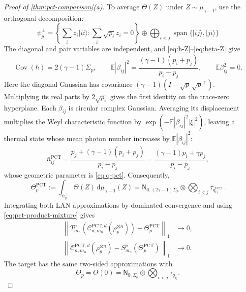 \documentclass[11pt]{article}
\theoremstyle{remark}
\theoremstyle{plain}
\newcommand{\cC}{\mathcal C}
\newcommand{\dd}{\mathrm d}
\newcommand{\ket}[1]{|#1\rangle}
\newcommand{\ot}{\otimes}
\begin{document}
\begin{proof}[Proof of \cref{thm:pct-comparison}\textup{(a)}]
To average \(\Theta(Z)\) under \(Z\sim\mu_{\gamma-1}\), use the
orthogonal decomposition:
\[
  \psi_p^\perp=
  \left\{\sum_i z_i\ket{ii}:\sum_i\sqrt{p_i}z_i=0\right\}
  \oplus\bigoplus_{i<j}\operatorname{span}\{\ket{ij},\ket{ji}\}
\]
The diagonal and pair variables are independent, and
\eqref{eq:h-Z}--\eqref{eq:beta-Z} give
\begin{equation}\label{eq:pct-displacement-covariances}
  \operatorname{Cov}(h)=2(\gamma-1)\Sigma_p,\qquad
  \mathbb E|\beta_{ij}|^2
    =\frac{(\gamma-1)(p_i+p_j)}{p_i-p_j},
  \qquad
  \mathbb E\beta_{ij}^2=0.
\end{equation}
Here the diagonal Gaussian has covariance
\((\gamma-1)(I-\sqrt p\,\sqrt p^{\,\mathsf T})\). Multiplying its real
parts by \(2\sqrt{p_i}\) gives the first identity on the trace-zero
hyperplane.  Each \(\beta_{ij}\) is circular complex Gaussian.  Averaging
its displacement multiplies the Weyl characteristic function by
\(\exp(-\mathbb E|\beta_{ij}|^2|\xi|^2)\), leaving a thermal state
whose mean photon number increases by \(\mathbb E|\beta_{ij}|^2\):
\begin{equation}\label{eq:thermal-mean-out}
  \bar n_{ij}^{\mathrm{PCT}}
  =\frac{p_j+(\gamma-1)(p_i+p_j)}{p_i-p_j}
  =\frac{(\gamma-1)p_i+\gamma p_j}{p_i-p_j},
\end{equation}
whose geometric parameter is \eqref{eq:q-pct}.  Consequently,
\begin{equation}\label{eq:pct-lan-output}
  \Theta_p^{\mathrm{PCT}}
  :=\int_{\psi_p^\perp}\Theta(Z)\,\dd\mu_{\gamma-1}(Z)
  =\mathsf N_{0,(2\gamma-1)\Sigma_p}
   \ot\bigotimes_{i<j}\tau_{q_{ij}^{\mathrm{PCT}}}.
\end{equation}
Integrating both LAN approximations by dominated convergence and
using \eqref{eq:pct-product-mixture} gives
\begin{align}
  \left\|T_{m_n}^p(\cC_{n,m_n}^{\mathrm{PCT},d}(\rho_p^{\ot n}))
                   -\Theta_p^{\mathrm{PCT}}\right\|_1&\longrightarrow0,
  \label{eq:pct-forward-state-limit}\\
  \left\|\cC_{n,m_n}^{\mathrm{PCT},d}(\rho_p^{\ot n})
                   -S_{m_n}^p(\Theta_p^{\mathrm{PCT}})\right\|_1
                   &\longrightarrow0.
  \label{eq:pct-reverse-state-limit}
\end{align}
The target has the same two-sided approximations with
\begin{equation}\label{eq:target-lan-output}
  \Theta_p=\Theta(0)
  =\mathsf N_{0,\Sigma_p}\ot\bigotimes_{i<j}\tau_{q_{ij}}.
\end{equation}


\end{proof}
\end{document}
